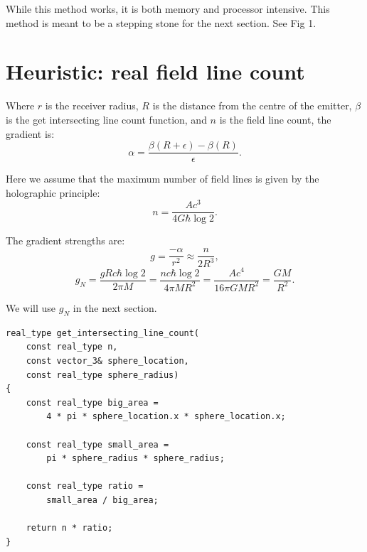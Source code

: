 \documentclass[12pt]{article}
\begin{document}
While this method works, it is both memory and processor intensive.
This method is meant to be a stepping stone for the next section.
See Fig 1.


\section{Heuristic: real field line count}

Where $r$ is the receiver radius, $R$ is the distance from the centre of the emitter, $\beta$ is the get intersecting line count function, and $n$ is the field line count, the gradient is:
\begin{equation}
\alpha = \frac{\beta(R + \epsilon) - \beta(R)}{\epsilon}.
\end{equation}

Here we assume that the maximum number of field lines is given by the holographic principle:
\begin{equation}
n = \frac{A c^3}{ 4 G \hbar \log 2}.
\end{equation}

The gradient strengths are:
\begin{equation}
g = \frac{-\alpha}{r^2} \approx \frac{n}{2 R^3},
\end{equation}
\begin{equation}
\label{g_N_equation}
g_N = \frac{g R c \hbar \log 2}{2 \pi M} = \frac{n c \hbar \log 2}{4 \pi M R^2} = \frac{A c^4}{16 \pi G M R^2} = \frac{G M}{R^2}.
\end{equation}

We will use $g_N$ in the next section.

\begin{lstlisting}
real_type get_intersecting_line_count(
	const real_type n,
	const vector_3& sphere_location,
	const real_type sphere_radius)
{
	const real_type big_area = 
		4 * pi * sphere_location.x * sphere_location.x;

	const real_type small_area = 
		pi * sphere_radius * sphere_radius;
	
	const real_type ratio = 
		small_area / big_area;
	
	return n * ratio;
}
\end{lstlisting}
\end{document}
